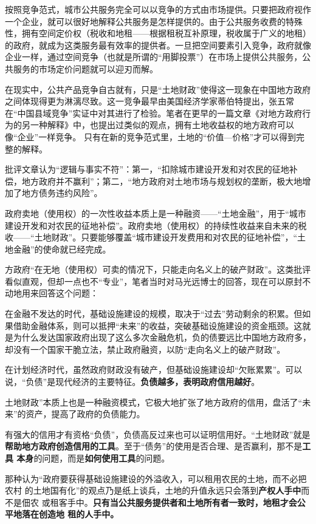 按照竞争范式，城市公共服务完全可以以竞争的方式由市场提供。只要把政府视作一个企业，就可以很好地解释公共服务是怎样提供的。由于公共服务收费的特殊性，拥有空间定价权（税收和地租——根据租税互补原理，税收属于广义的地租）的政府，就成为这类服务最有效率的提供者。一旦把空间要素引入竞争，政府就像企业一样，通过空间竞争（也就是所谓的“用脚投票”）在市场上提供公共服务，公共服务的市场定价问题就可以迎刃而解。

在现实中，公共产品竞争自古就有，只是“土地财政”使得这一现象在中国地方政府之间体现得更为淋漓尽致。这一竞争最早由美国经济学家蒂伯特提出，张五常在“中国县域竞争”实证中对其进行了检验。笔者在更早的一篇文章《对地方政府行为的另一种解释》中，也提出过类似的观点，拥有土地收益权的地方政府可以像“企业”一样竞争。
只有在新的竞争范式里，土地的“价值—价格”才可以得到完整的解释。

批评文章认为“逻辑与事实不符”：第一，“扣除城市建设开发和对农民的征地补偿，地方政府并不赢利”；第二，“地方政府对土地市场与规划权的垄断，极大地增加了地方债务违约风险”。

政府卖地（使用权）的一次性收益本质上是一种融资——“土地金融”，用于“城市建设开发和对农民的征地补偿”。政府卖地（使用权）的持续性收益来自未来的税收——“土地财政”。只要能够覆盖“城市建设开发费用和对农民的征地补偿”，“土地金融”的使命就已经完成。

方政府“在无地（使用权）可卖的情况下，只能走向名义上的破产财政”。这类批评看似直观，但却一点也不“专业”，笔者当时对马光远博士的回答，现在可以原封不动地用来回答这个问题：

在金融不发达的时代，基础设施建设的规模，取决于“过去”劳动剩余的积累。但如果借助金融体系，则可以抵押“未来”的收益，突破基础设施建设的资金瓶颈。这就是为什么发达国家政府出现了这么多次金融危机，负的债要远比中国地方政府多，却没有一个国家干脆立法，禁止政府融资，以防“走向名义上的破产财政”。

在计划经济时代，虽然政府财政没有破产，但基础设施建设却“欠账累累”。可以说，“负债”是现代经济的主要特征。\textbf{负债越多，表明政府信用越好}。

土地财政”本质上也是一种融资模式，它极大地扩张了地方政府的信用，盘活了“未来”的资产，提高了政府的负债能力。

有强大的信用才有资格“负债”，负债高反过来也可以证明信用好。“土地财政”就是
\textbf{帮助地方政府创造信用的工具}。至于“债务”的使用是否合理、是否赢利，那不是\textbf{工具
本身}的问题，而是\textbf{如何使用工具}的问题。


那种认为“政府要获得基础设施建设的外溢收入，可以租用农民的土地，而不必把农村
的土地国有化”的观点乃是纸上谈兵，土地的升值永远只会落到\textbf{产权人手中}而不是佃农
或租客手中。\textbf{只有当公共服务提供者和土地所有者一致时，地租才会公平地落在创造地
租的人手中。}

